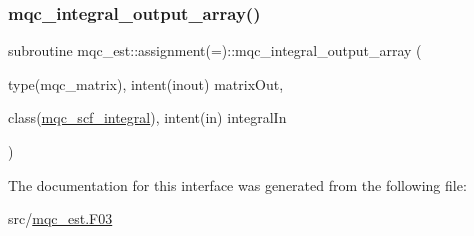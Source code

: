 \mbox{\label{interfacemqc__est_1_1assignment_07_0A_08_ac576f99113cbe722806bac575bdadc18}} 
\subsubsection{\texorpdfstring{mqc\_integral\_output\_array()}{mqc\_integral\_output\_array()}}
{\footnotesize\ttfamily subroutine mqc\+\_\+est\+::assignment(=)\+::mqc\+\_\+integral\+\_\+output\+\_\+array (\begin{DoxyParamCaption}\item[{type(mqc\+\_\+matrix), intent(inout)}]{matrix\+Out,  }\item[{class(\mbox{\hyperlink{structmqc__est_1_1mqc__scf__integral}{mqc\+\_\+scf\+\_\+integral}}), intent(in)}]{integral\+In }\end{DoxyParamCaption})}



The documentation for this interface was generated from the following file\+:\begin{DoxyCompactItemize}
\item 
src/\mbox{\hyperlink{mqc__est_8_f03}{mqc\+\_\+est.\+F03}}\end{DoxyCompactItemize}
